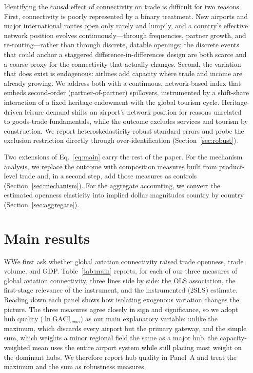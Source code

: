 Identifying the causal effect of connectivity on trade is difficult for two
reasons. First, connectivity is poorly represented by a binary treatment. New
airports and major international routes open only rarely and lumpily, and a
country's effective network position evolves continuously---through
frequencies, partner growth, and re-routing---rather than through discrete,
datable openings; the discrete events that could anchor a staggered
difference-in-differences design are both scarce and a coarse proxy for the
connectivity that actually changes. Second, the variation that does exist is
endogenous: airlines add capacity where trade and income are already growing.
We address both with a continuous, network-based index that embeds second-order
(partner-of-partner) spillovers, instrumented by a shift-share interaction
\citep{GoldsmithPinkham_2020,Borusyak_2022} of a fixed heritage endowment with
the global tourism cycle. Heritage-driven leisure demand shifts an airport's
network position for reasons unrelated to goods-trade fundamentals, while the
outcome excludes services and tourism by construction. We report
heteroskedasticity-robust standard errors and probe the exclusion restriction
directly through over-identification (Section~\ref{sec:robust}).

Two extensions of Eq.~\eqref{eq:main} carry the rest of the paper. For the
mechanism analysis, we replace the outcome with composition measures built
from product-level trade and, in a second step, add those measures as controls
(Section~\ref{sec:mechanism}). For the aggregate accounting, we convert the
estimated openness elasticity into implied dollar magnitudes country by
country (Section~\ref{sec:aggregate}).

\section{Main results}
\label{sec:results}

WWe first ask whether global aviation connectivity raised trade openness, trade
volume, and GDP. Table~\ref{tab:main} reports, for each of our three measures of
global aviation connectivity, three lines side by side: the OLS association, the
first-stage relevance of the instrument, and the instrumented (2SLS) estimate.
Reading down each panel shows how isolating exogenous variation changes the
picture. The three measures agree closely in sign and significance, so we adopt
hub quality ($\ln\mathrm{GACI}_{cwm}$) as our main explanatory variable: unlike
the maximum, which discards every airport but the primary gateway, and the simple
sum, which weights a minor regional field the same as a major hub, the
capacity-weighted mean uses the entire airport system while still placing most
weight on the dominant hubs. We therefore report hub quality in Panel~A and treat
the maximum and the sum as robustness measures.

